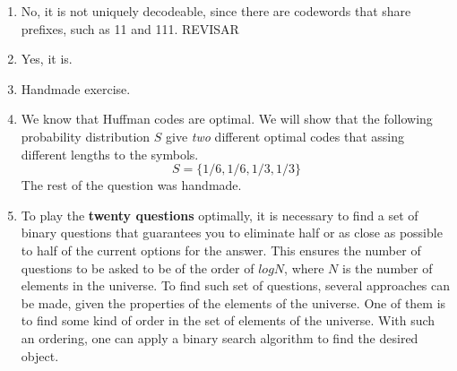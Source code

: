 \documentclass{article}
\begin{document}
\begin{enumerate}
	\item No, it is not uniquely decodeable, since there are codewords that share prefixes, such as 11 and 111. REVISAR
	\item Yes, it is.
	\item Handmade exercise.
	\item We know that Huffman codes are optimal. We will show that the following probability distribution \(S\) give \textit{two} different optimal codes that assing different lengths to the symbols.
	      \[S = \{1/6,1/6,1/3,1/3\}\]
	      The rest of the question was handmade.

	\item To play the \textbf{twenty questions} optimally, it is necessary to find a set of binary questions that guarantees you to eliminate half or as close as possible to half of the current options for the answer. This ensures the number of questions to be asked to be of the order of \(log N\), where \(N\) is the number of elements in the universe. To find such set of questions, several approaches can be made, given the properties of the elements of the universe. One of them is to find some kind of order in the set of elements of the universe. With such an ordering, one can apply a binary search algorithm to find the desired object.
\end{enumerate}


\end{document}
